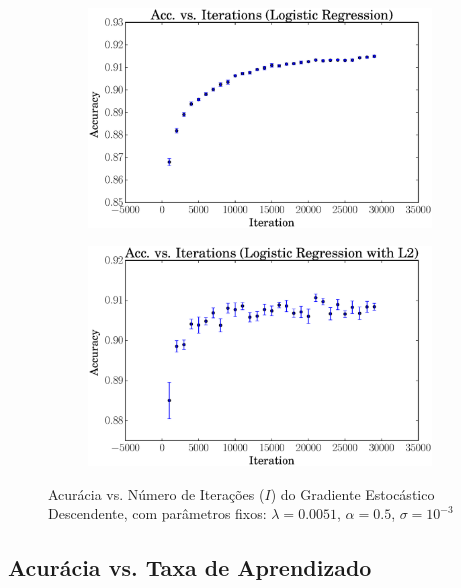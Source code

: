 \documentclass[a4paper, 12pt]{article}
\begin{document}
\begin{figure}[htpb]
\begin{subfigure}[htpb]{0.45\textwidth}
        \includegraphics[width=\textwidth]{acc_vs_iterations_logreg}
        \caption{}
        \label{fig:it_logreg}
    \end{subfigure}
    \begin{subfigure}[htpb]{0.45\textwidth}
        \includegraphics[width=\textwidth]{acc_vs_iterations_logregL2}
        \caption{}
        \label{fig:it_logregL2}
    \end{subfigure}
    \caption{Acurácia vs. Número de Iterações ($I$) do Gradiente Estocástico
    Descendente, com parâmetros fixos: $\lambda=0.0051$, $\alpha=0.5$,
    $\sigma=10^{-3}$}\label{fig:it}
\end{figure}

\newpage
\subsection{Acurácia vs. Taxa de Aprendizado}
\end{document}
